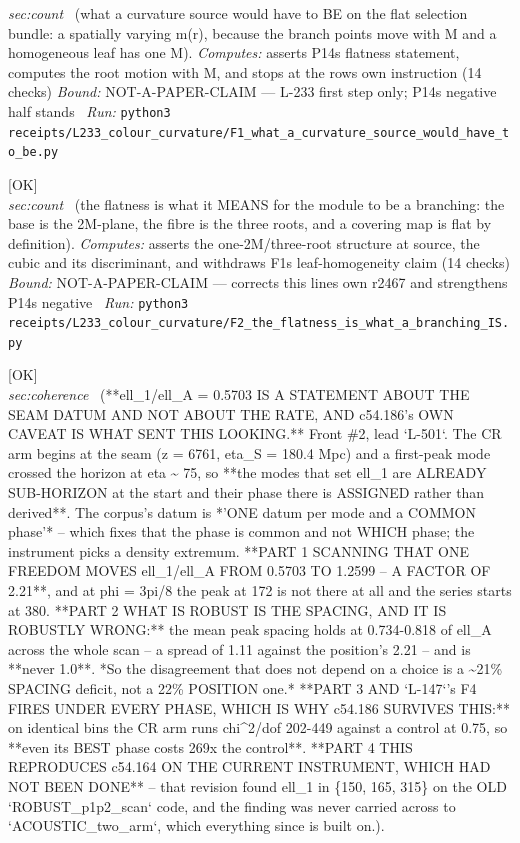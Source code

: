 \begin{description}
\textit{sec:count} \ (what a curvature source would have to BE on the flat selection bundle: a spatially varying m(r), because the branch points move with M and a homogeneous leaf has one M). 
\emph{Computes:} asserts P14s flatness statement, computes the root motion with M, and stops at the rows own instruction (14 checks)
 \emph{Bound:} NOT-A-PAPER-CLAIM --- L-233 first step only; P14s negative half stands
\ \emph{Run:} \texttt{python3 receipts/L233\_colour\_curvature/F1\_what\_a\_curvature\_source\_would\_have\_to\_be.py}
\item[\label{rcpt:F2_the_flatness_is_what_a_branching_IS}\texttt{F2\_the\_flatness\_is\_what\_a\_branching\_IS}]\hfill\textsf{[OK]}\\
\textit{sec:count} \ (the flatness is what it MEANS for the module to be a branching: the base is the 2M-plane, the fibre is the three roots, and a covering map is flat by definition). 
\emph{Computes:} asserts the one-2M/three-root structure at source, the cubic and its discriminant, and withdraws F1s leaf-homogeneity claim (14 checks)
 \emph{Bound:} NOT-A-PAPER-CLAIM --- corrects this lines own r2467 and strengthens P14s negative
\ \emph{Run:} \texttt{python3 receipts/L233\_colour\_curvature/F2\_the\_flatness\_is\_what\_a\_branching\_IS.py}
\item[\label{rcpt:P15_the_first_peak_is_the_seam_datum_and_the_spacing_is_not}\texttt{P15\_the\_first\_peak\_is\_the\_seam\_datum\_and\_the\_spacing\_is\_not}]\hfill\textsf{[OK]}\\
\textit{sec:coherence} \ (**ell\_1/ell\_A = 0.5703 IS A STATEMENT ABOUT THE SEAM DATUM AND NOT ABOUT THE RATE, AND c54.186's OWN CAVEAT IS WHAT SENT THIS LOOKING.** Front \#2, lead `L-501`. The CR arm begins at the seam (z = 6761, eta\_S = 180.4 Mpc) and a first-peak mode crossed the horizon at eta \textasciitilde{} 75, so **the modes that set ell\_1 are ALREADY SUB-HORIZON at the start and their phase there is ASSIGNED rather than derived**. The corpus's datum is *'ONE datum per mode and a COMMON phase'* -- which fixes that the phase is common and not WHICH phase; the instrument picks a density extremum. **PART 1 SCANNING THAT ONE FREEDOM MOVES ell\_1/ell\_A FROM 0.5703 TO 1.2599 -- A FACTOR OF 2.21**, and at phi = 3pi/8 the peak at 172 is not there at all and the series starts at 380. **PART 2 WHAT IS ROBUST IS THE SPACING, AND IT IS ROBUSTLY WRONG:** the mean peak spacing holds at 0.734-0.818 of ell\_A across the whole scan -- a spread of 1.11 against the position's 2.21 -- and is **never 1.0**. *So the disagreement that does not depend on a choice is a \textasciitilde{}21\% SPACING deficit, not a 22\% POSITION one.* **PART 3 AND `L-147`'s F4 FIRES UNDER EVERY PHASE, WHICH IS WHY c54.186 SURVIVES THIS:** on identical bins the CR arm runs chi\textasciicircum{}2/dof 202-449 against a control at 0.75, so **even its BEST phase costs 269x the control**. **PART 4 THIS REPRODUCES c54.164 ON THE CURRENT INSTRUMENT, WHICH HAD NOT BEEN DONE** -- that revision found ell\_1 in \{150, 165, 315\} on the OLD `ROBUST\_p1p2\_scan` code, and the finding was never carried across to `ACOUSTIC\_two\_arm`, which everything since is built on.). 

\end{description}
